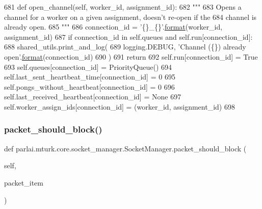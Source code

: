 \begin{DoxyCode}
681     \textcolor{keyword}{def }open\_channel(self, worker\_id, assignment\_id):
682         \textcolor{stringliteral}{"""}
683 \textcolor{stringliteral}{        Opens a channel for a worker on a given assignment, doesn't re-open if the}
684 \textcolor{stringliteral}{        channel is already open.}
685 \textcolor{stringliteral}{        """}
686         connection\_id = \textcolor{stringliteral}{'\{\}\_\{\}'}.\hyperlink{namespaceparlai_1_1chat__service_1_1services_1_1messenger_1_1shared__utils_a32e2e2022b824fbaf80c747160b52a76}{format}(worker\_id, assignment\_id)
687         \textcolor{keywordflow}{if} connection\_id \textcolor{keywordflow}{in} self.queues \textcolor{keywordflow}{and} self.run[connection\_id]:
688             shared\_utils.print\_and\_log(
689                 logging.DEBUG, \textcolor{stringliteral}{'Channel (\{\}) already open'}.\hyperlink{namespaceparlai_1_1chat__service_1_1services_1_1messenger_1_1shared__utils_a32e2e2022b824fbaf80c747160b52a76}{format}(connection\_id)
690             )
691             \textcolor{keywordflow}{return}
692         self.run[connection\_id] = \textcolor{keyword}{True}
693         self.queues[connection\_id] = PriorityQueue()
694         self.last\_sent\_heartbeat\_time[connection\_id] = 0
695         self.pongs\_without\_heartbeat[connection\_id] = 0
696         self.last\_received\_heartbeat[connection\_id] = \textcolor{keywordtype}{None}
697         self.worker\_assign\_ids[connection\_id] = (worker\_id, assignment\_id)
698 
\end{DoxyCode}
\mbox{\label{classparlai_1_1mturk_1_1core_1_1socket__manager_1_1SocketManager_a7b41199438da8694cc9c8d9b3e58da85}} 
\subsubsection{\texorpdfstring{packet\+\_\+should\+\_\+block()}{packet\_should\_block()}}
{\footnotesize\ttfamily def parlai.\+mturk.\+core.\+socket\+\_\+manager.\+Socket\+Manager.\+packet\+\_\+should\+\_\+block (\begin{DoxyParamCaption}\item[{}]{self,  }\item[{}]{packet\+\_\+item }\end{DoxyParamCaption})}


